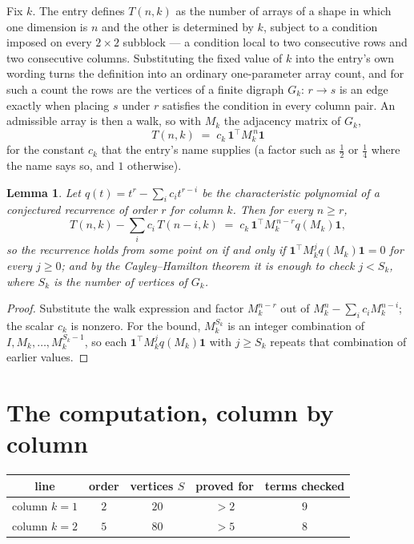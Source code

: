 \documentclass[11pt,a4paper]{article}
\theoremstyle{plain}
\newtheorem{lemma}[theorem]{Lemma}
\theoremstyle{definition}
\begin{document}
Fix $k$. The entry defines $T(n,k)$ as the number of arrays of a shape in which one dimension
is $n$ and the other is determined by $k$, subject to a condition imposed on every
$2\times2$ subblock --- a condition local to two consecutive rows and two consecutive columns.
Substituting the fixed value of $k$ into the entry's own wording turns the definition into an
ordinary one-parameter array count, and for such a count the rows are the vertices of a finite
digraph $G_k$: $r\to s$ is an edge exactly when placing $s$ under $r$ satisfies the condition
in every column pair. An admissible array is then a walk, so with $M_k$ the adjacency matrix
of $G_k$,
\[
T(n,k)\;=\;c_k\,\mathbf{1}^{\!\top}M_k^{\,n}\mathbf{1}
\]
for the constant $c_k$ that the entry's name supplies (a factor such as $\tfrac12$ or
$\tfrac14$ where the name says so, and $1$ otherwise).

\begin{lemma}\label{lem:crit}
Let $q(t)=t^{r}-\sum_i c_it^{r-i}$ be the characteristic polynomial of a conjectured
recurrence of order $r$ for column $k$. Then for every $n\ge r$,
\[
T(n,k)-\sum_i c_i\,T(n-i,k)\;=\;c_k\,\mathbf{1}^{\!\top}M_k^{\,n-r}q(M_k)\mathbf{1},
\]
so the recurrence holds from some point on if and only if
$\mathbf{1}^{\!\top}M_k^{j}q(M_k)\mathbf{1}=0$ for every $j\ge0$; and by the
Cayley--Hamilton theorem it is enough to check $j<S_k$, where $S_k$ is the number of vertices
of $G_k$.
\end{lemma}

\begin{proof}
Substitute the walk expression and factor $M_k^{n-r}$ out of $M_k^{n}-\sum_ic_iM_k^{n-i}$;
the scalar $c_k$ is nonzero. For the bound, $M_k^{S_k}$ is an integer combination of
$I,M_k,\dots,M_k^{S_k-1}$, so each $\mathbf{1}^{\!\top}M_k^{j}q(M_k)\mathbf{1}$ with
$j\ge S_k$ repeats that combination of earlier values.
\end{proof}

\section{The computation, column by column}

\begin{center}
\begin{tabular}{ccccc}
line & order & vertices $S$ & proved for & terms checked \\ \hline
column $k$$=1$ & $2$ & $20$ & $>2$ & $9$ \\
column $k$$=2$ & $5$ & $80$ & $>5$ & $8$ \\
\end{tabular}
\end{center}
\end{document}
